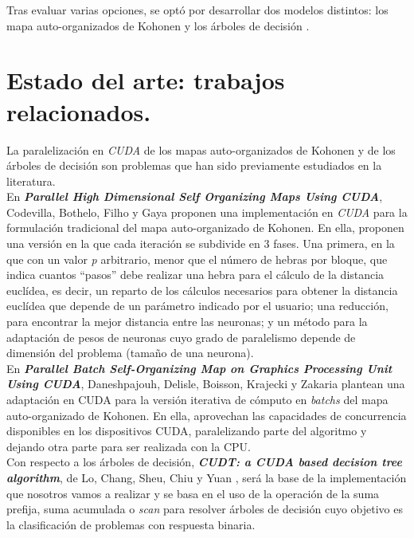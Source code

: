 \documentclass[a4paper,oneside,11pt,titlepage]{book}
\begin{document}
Tras evaluar varias opciones, se optó por desarrollar dos modelos distintos: los mapa auto-organizados de Kohonen \cite{kohonensom} y los árboles de decisión \cite{arbol}.\\

\section{Estado del arte: trabajos relacionados.}
La paralelización en \textit{CUDA} de los mapas auto-organizados de Kohonen y de los árboles de decisión son problemas que han sido previamente estudiados en la literatura.\\

En \textbf{\textit{Parallel High Dimensional Self Organizing Maps Using CUDA}}, Codevilla, Bothelo, Filho y Gaya \cite{cudasomonline} proponen una implementación en \textit{CUDA} para la formulación tradicional del mapa auto-organizado de Kohonen. En ella, proponen una versión en la que cada iteración se subdivide en 3 fases. Una primera, en la que con un valor \textit{p} arbitrario, menor que el número de hebras por bloque, que indica cuantos ``pasos'' debe realizar una hebra para el cálculo de la distancia euclídea, es decir, un reparto de los cálculos necesarios para obtener la distancia euclídea que depende de un parámetro indicado por el usuario; una reducción, para encontrar la mejor distancia entre las neuronas; y un método para la adaptación de pesos de neuronas cuyo grado de paralelismo depende de dimensión del problema (tamaño de una neurona). \\

En \textbf{\textit{Parallel Batch Self-Organizing Map on Graphics Processing Unit Using CUDA}}, Daneshpajouh, Delisle, Boisson, Krajecki y Zakaria \cite{cudasombatch} plantean una adaptación en CUDA para la versión iterativa de cómputo en \textit{batchs} del mapa auto-organizado de Kohonen. En ella, aprovechan las capacidades de concurrencia disponibles en los dispositivos CUDA, paralelizando parte del algoritmo y dejando otra parte para ser realizada con la CPU.\\

Con respecto a los árboles de decisión, \textbf{\textit{CUDT: a CUDA based decision tree algorithm}}, de Lo, Chang, Sheu, Chiu y Yuan \cite{cudt}, será la base de la implementación que nosotros vamos a realizar y se basa en el uso de la operación de la suma prefija, suma acumulada o \textit{scan} para resolver árboles de decisión cuyo objetivo es la clasificación de problemas con respuesta binaria.\\
\end{document}
